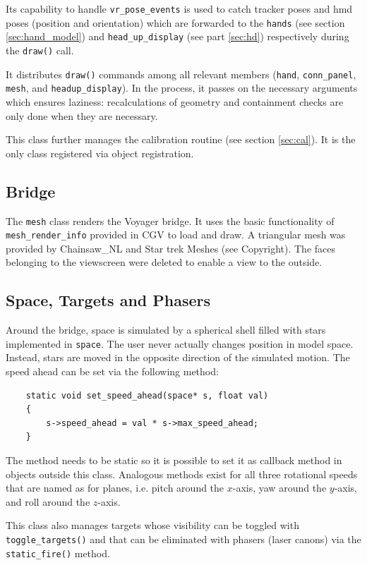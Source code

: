 \documentclass[hyperref, bachelorofscience]{cgvpub}
\begin{document}
Its capability to handle \lstinline|vr_pose_events| is used to catch tracker poses and \acrshort{hmd} poses (position and orientation) which are forwarded to the \lstinline|hands| (see section \ref{sec:hand_model}) and \lstinline|head_up_display| (see part \ref{sec:hd}) respectively during the \lstinline|draw()| call. 

It distributes \lstinline|draw()| commands among all relevant members (\lstinline|hand|, \lstinline|conn_panel|, \lstinline|mesh|, and \lstinline|headup_display|). In the process, it passes on the necessary arguments which ensures laziness: recalculations of geometry and containment checks are only done when they are necessary.

This class further manages the calibration routine (see section \ref{sec:cal}). It is the only class registered via object registration.

\subsection{Bridge}
The \lstinline|mesh| class renders the Voyager bridge. It uses the basic functionality of \lstinline|mesh_render_info| provided in \gls{CGV} to load and draw. A triangular mesh was provided by Chainsaw\_NL and Star trek Meshes (see Copyright). The faces belonging to the viewscreen were deleted to enable a view to the outside.

\subsection{Space, Targets and Phasers}
Around the bridge, space is simulated by a spherical shell filled with stars implemented in \lstinline|space|. The user never actually changes position in model space. Instead, stars are moved in the opposite direction of the simulated motion. The speed ahead can be set via the following method: 
\begin{lstlisting}
	static void set_speed_ahead(space* s, float val) 
	{ 
		s->speed_ahead = val * s->max_speed_ahead; 
	}
\end{lstlisting}

The method needs to be static so it is possible to set it as callback method in objects outside this class. Analogous methods exist for all three rotational speeds that are named as for planes, i.e. pitch around the $ x $-axis, yaw around the $ y $-axis, and roll around the $ z $-axis. 

This class also manages targets whose visibility can be toggled with \lstinline|toggle_targets()| and that can be eliminated with phasers (laser canons) via the \lstinline|static_fire()| method. 
\end{document}
